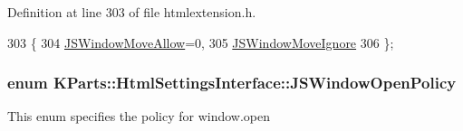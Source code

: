 Definition at line 303 of file htmlextension.\+h.


\begin{DoxyCode}
303                             \{
304         \hyperlink{classKParts_1_1HtmlSettingsInterface_a2774dbe8635ec916babf19de468d6c34a737536429edb7501bfc0a0e094c31005}{JSWindowMoveAllow}=0,
305         \hyperlink{classKParts_1_1HtmlSettingsInterface_a2774dbe8635ec916babf19de468d6c34affadad155cdf06f9eb98da8e1aa7cbb1}{JSWindowMoveIgnore}
306     \};
\end{DoxyCode}
\hypertarget{classKParts_1_1HtmlSettingsInterface_aab245c057a7179fc1bdc16e020750643}{
\subsubsection[{J\+S\+Window\+Open\+Policy}]{\setlength{\rightskip}{0pt plus 5cm}enum {\bf K\+Parts\+::\+Html\+Settings\+Interface\+::\+J\+S\+Window\+Open\+Policy}}}\label{classKParts_1_1HtmlSettingsInterface_aab245c057a7179fc1bdc16e020750643}
This enum specifies the policy for window.\+open


